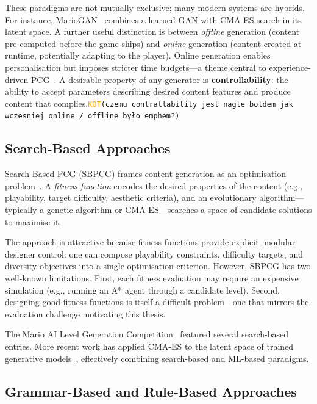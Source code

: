\documentclass[shortabstract, mgr, english]{iithesis}
\newcommand{\DEBUG}[1]{{#1}} %
\newcommand{\KOT}[1]{\DEBUG{\tt{\textcolor{orange}{KOT}(}{#1}{)}}}
\begin{document}
These paradigms are not mutually exclusive; many modern systems are hybrids. For
instance, MarioGAN~\citep{volz2018evolving} combines a learned GAN with CMA-ES
search in its latent space. A further useful distinction is between \emph{offline}
generation (content pre-computed before the game ships) and \emph{online}
generation (content created at runtime, potentially adapting to the player).
Online generation enables personalisation but imposes stricter time
budgets---a theme central to experience-driven
PCG~\citep{yannakakis2011experience}. A desirable property of any generator is
\textbf{controllability}: the ability to accept parameters describing desired
content features and produce content that complies.\KOT{czemu contrallability jest nagle boldem jak wczesniej online / offline było emphem?}

\subsection{Search-Based Approaches}
\label{subsec:bg-search}

Search-Based PCG (SBPCG) frames content generation as an optimisation
problem~\citep{togelius2011search}. A \emph{fitness function} encodes the desired
properties of the content (e.g., playability, target difficulty, aesthetic
criteria), and an evolutionary algorithm---typically a genetic algorithm or
CMA-ES---searches a space of candidate solutions to maximise it.

The approach is attractive because fitness functions provide explicit, modular
designer control: one can compose playability constraints, difficulty targets,
and diversity objectives into a single optimisation criterion. However, SBPCG has
two well-known limitations. First, each fitness evaluation may require an
expensive simulation (e.g., running an A* agent through a candidate level).
Second, designing good fitness functions is itself a difficult problem---one that
mirrors the evaluation challenge motivating this thesis.

The Mario AI Level Generation Competition~\citep{shaker2011mario} featured
several search-based entries. More recent work has applied CMA-ES to the latent
space of trained generative models~\citep{volz2018evolving}, effectively combining
search-based and ML-based paradigms.

\subsection{Grammar-Based and Rule-Based Approaches}
\label{subsec:bg-grammar}
\end{document}
